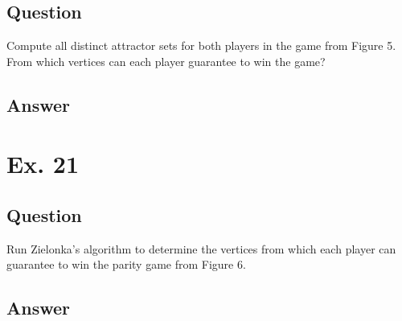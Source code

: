 \documentclass[12pt]{article}
\begin{document}
\subsection{Question}
Compute all distinct attractor sets for both players in the game from Figure 5. From which vertices can each player guarantee to win the game?

\subsection{Answer}

\section{Ex. 21}
\subsection{Question}
Run Zielonka’s algorithm to determine the vertices from which each player can guarantee to win the parity game from Figure 6.

\subsection{Answer}
\end{document}

